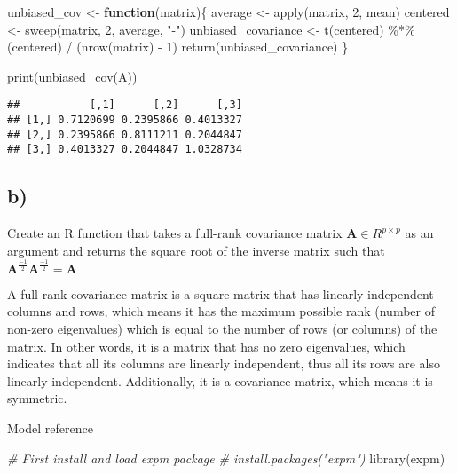 \documentclass[
]{article}
\newenvironment{Shaded}{\begin{snugshade}}{\end{snugshade}}
\newcommand{\CommentTok}[1]{\textcolor[rgb]{0.56,0.35,0.01}{\textit{#1}}}
\newcommand{\ControlFlowTok}[1]{\textcolor[rgb]{0.13,0.29,0.53}{\textbf{#1}}}
\newcommand{\DecValTok}[1]{\textcolor[rgb]{0.00,0.00,0.81}{#1}}
\newcommand{\FunctionTok}[1]{\textcolor[rgb]{0.00,0.00,0.00}{#1}}
\newcommand{\NormalTok}[1]{#1}
\newcommand{\OtherTok}[1]{\textcolor[rgb]{0.56,0.35,0.01}{#1}}
\newcommand{\SpecialCharTok}[1]{\textcolor[rgb]{0.00,0.00,0.00}{#1}}
\newcommand{\StringTok}[1]{\textcolor[rgb]{0.31,0.60,0.02}{#1}}
\begin{document}
\begin{Shaded}
\begin{Highlighting}[]
\NormalTok{unbiased\_cov }\OtherTok{\textless{}{-}} \ControlFlowTok{function}\NormalTok{(matrix)\{}
\NormalTok{  average }\OtherTok{\textless{}{-}} \FunctionTok{apply}\NormalTok{(matrix, }\DecValTok{2}\NormalTok{, mean)}
\NormalTok{  centered }\OtherTok{\textless{}{-}}  \FunctionTok{sweep}\NormalTok{(matrix, }\DecValTok{2}\NormalTok{, average, }\StringTok{"{-}"}\NormalTok{)}
\NormalTok{  unbiased\_covariance }\OtherTok{\textless{}{-}} \FunctionTok{t}\NormalTok{(centered) }\SpecialCharTok{\%*\%}\NormalTok{ (centered) }\SpecialCharTok{/}\NormalTok{ (}\FunctionTok{nrow}\NormalTok{(matrix) }\SpecialCharTok{{-}} \DecValTok{1}\NormalTok{)}
  \FunctionTok{return}\NormalTok{(unbiased\_covariance)}
\NormalTok{\}}

\FunctionTok{print}\NormalTok{(}\FunctionTok{unbiased\_cov}\NormalTok{(A))}
\end{Highlighting}
\end{Shaded}

\begin{verbatim}
##           [,1]      [,2]      [,3]
## [1,] 0.7120699 0.2395866 0.4013327
## [2,] 0.2395866 0.8111211 0.2044847
## [3,] 0.4013327 0.2044847 1.0328734
\end{verbatim}

\hypertarget{b}{%
\subsection{b)}\label{b}}

Create an R function that takes a full-rank covariance matrix
\(\textbf{A} \in R^{p\times p}\) as an argument and returns the square
root of the inverse matrix such that
\(\textbf{A} ^ {\frac{-1}{2}} \textbf{A} ^{\frac{-1}{2}} = \textbf{A} ^ {}\)

A full-rank covariance matrix is a square matrix that has linearly
independent columns and rows, which means it has the maximum possible
rank (number of non-zero eigenvalues) which is equal to the number of
rows (or columns) of the matrix. In other words, it is a matrix that has
no zero eigenvalues, which indicates that all its columns are linearly
independent, thus all its rows are also linearly independent.
Additionally, it is a covariance matrix, which means it is symmetric.

Model reference

\begin{Shaded}
\begin{Highlighting}[]
\CommentTok{\# First install and load expm package}
\CommentTok{\# install.packages("expm")}
\FunctionTok{library}\NormalTok{(expm)}
\end{Highlighting}
\end{Shaded}
\end{document}
